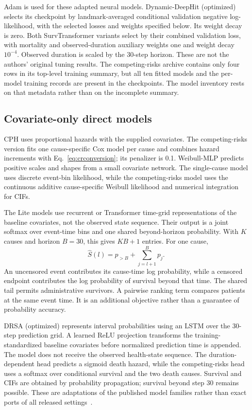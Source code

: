 Adam is used for these adapted neural models. Dynamic-DeepHit (optimized) selects its checkpoint by landmark-averaged conditional validation negative log-likelihood, with the selected losses and weights specified below. Its weight decay is zero. Both SurvTransformer variants select by their combined validation loss, with mortality and observed-duration auxiliary weights one and weight decay $10^{-4}$. Observed duration is scaled by the 30-step horizon. These are not the authors' original tuning results. The competing-risks archive contains only four rows in its top-level training summary, but all ten fitted models and the per-model training records are present in the checkpoints. The model inventory rests on that metadata rather than on the incomplete summary.

\subsection{Covariate-only direct models}
CPH uses proportional hazards with the supplied covariates. The competing-risks version fits one cause-specific Cox model per cause and combines hazard increments with Eq.~\eqref{eq:crconversion}; its penalizer is 0.1. Weibull-MLP predicts positive scales and shapes from a small covariate network. The single-cause model uses discrete event-bin likelihood, while the competing-risks model uses the continuous additive cause-specific Weibull likelihood and numerical integration for CIFs.

The Lite models use recurrent or Transformer time-grid representations of the baseline covariates, not the observed state sequence. Their output is a joint softmax over event-time bins and one shared beyond-horizon probability. With $K$ causes and horizon $B=30$, this gives $KB+1$ entries. For one cause,
\[
\widehat S(l)=p_{>B}+\sum_{j=l+1}^{B}p_j.
\]
An uncensored event contributes its cause-time log probability, while a censored endpoint contributes the log probability of survival beyond that time. The shared tail permits administrative survivors. A pairwise ranking term compares patients at the same event time. It is an additional objective rather than a guarantee of probability accuracy.

DRSA (optimized) represents interval probabilities using an LSTM over the 30-step prediction grid. A learned ReLU projection transforms the training-standardized baseline covariates before normalized prediction time is appended. The model does not receive the observed health-state sequence. The duration-dependent head predicts a sigmoid death hazard, while the competing-risks head uses a softmax over conditional survival and the two death causes. Survival and CIFs are obtained by probability propagation; survival beyond step 30 remains possible. These are adaptations of the published model families rather than exact ports of all released settings~\citep{ren2019,martinsson2017,lee2018deephit}.

